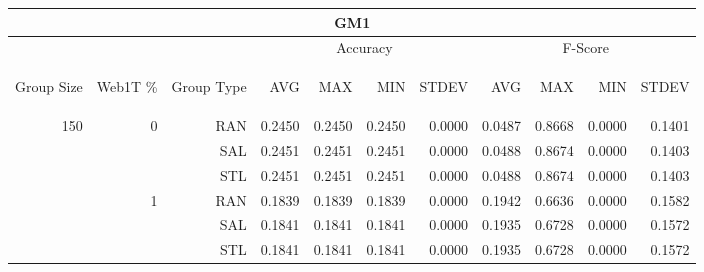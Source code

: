 \begin{center}
\begin{table}[htbp] 
 \begin{center}
\begin{tabular}{ | r | r | r | r | r | r | r | r | r | r | r |}
\hline
\multicolumn{11}{|c|}{GM1}\\
\hline
 & & & \multicolumn{4}{|c|}{Accuracy} & \multicolumn{4}{|c|}{F-Score}\\ \cline{4-11}
\begin{sideways}Group Size\end{sideways} & \begin{sideways}Web1T \%\end{sideways} & \begin{sideways}Group Type\end{sideways} & \begin{sideways}AVG\end{sideways} & \begin{sideways}MAX\end{sideways} & \begin{sideways}MIN\end{sideways} & \begin{sideways}STDEV\end{sideways} & \begin{sideways}AVG\end{sideways} & \begin{sideways}MAX\end{sideways} & \begin{sideways}MIN\end{sideways} & \begin{sideways}STDEV\end{sideways}\\
\hline
\multirow{18}{*}{150}
 & \multirow{3}{*}{0} & RAN & 0.2450 & 0.2450 & 0.2450 & 0.0000 & 0.0487 & 0.8668 & 0.0000 & 0.1401\\ \cline{3-11}
 &   & SAL & 0.2451 & 0.2451 & 0.2451 & 0.0000 & 0.0488 & 0.8674 & 0.0000 & 0.1403\\ \cline{3-11}
 &   & STL & 0.2451 & 0.2451 & 0.2451 & 0.0000 & 0.0488 & 0.8674 & 0.0000 & 0.1403\\ \cline{2-11}
 & \multirow{3}{*}{1} & RAN & 0.1839 & 0.1839 & 0.1839 & 0.0000 & 0.1942 & 0.6636 & 0.0000 & 0.1582\\ \cline{3-11}
 &   & SAL & 0.1841 & 0.1841 & 0.1841 & 0.0000 & 0.1935 & 0.6728 & 0.0000 & 0.1572\\ \cline{3-11}
 &   & STL & 0.1841 & 0.1841 & 0.1841 & 0.0000 & 0.1935 & 0.6728 & 0.0000 & 0.1572\\ \cline{2-11}

\end{tabular}
\end{center}
\end{table}
\end{center}
